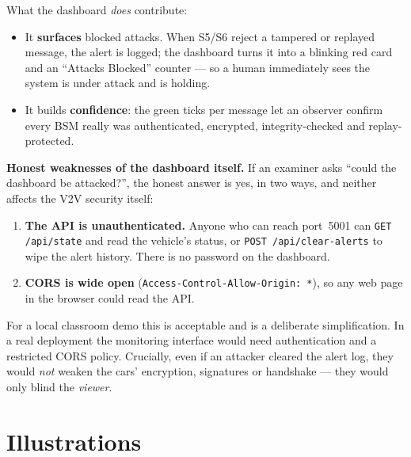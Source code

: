\documentclass[11pt,a4paper]{article}
\begin{document}
\medskip
\noindent What the dashboard \emph{does} contribute:
\begin{itemize}
  \item It \textbf{surfaces} blocked attacks. When S5/S6 reject a tampered or
        replayed message, the alert is logged; the dashboard turns it into a
        blinking red card and an ``Attacks Blocked'' counter --- so a human
        immediately sees the system is under attack and is holding.
  \item It builds \textbf{confidence}: the green ticks per message let an
        observer confirm every BSM really was authenticated, encrypted,
        integrity-checked and replay-protected.
\end{itemize}

\medskip
\noindent\textbf{Honest weaknesses of the dashboard itself.} If an examiner asks
``could the dashboard be attacked?'', the honest answer is yes, in two ways, and
neither affects the V2V security itself:
\begin{enumerate}
  \item \textbf{The API is unauthenticated.} Anyone who can reach port~5001 can
        \texttt{GET /api/state} and read the vehicle's status, or
        \texttt{POST /api/clear-alerts} to wipe the alert history. There is no
        password on the dashboard.
  \item \textbf{CORS is wide open} (\texttt{Access-Control-Allow-Origin: *}), so
        any web page in the browser could read the API.
\end{enumerate}
For a local classroom demo this is acceptable and is a deliberate simplification.
In a real deployment the monitoring interface would need authentication and a
restricted CORS policy. Crucially, even if an attacker cleared the alert log,
they would \emph{not} weaken the cars' encryption, signatures or handshake ---
they would only blind the \emph{viewer}.

\section{Illustrations}
\end{document}
